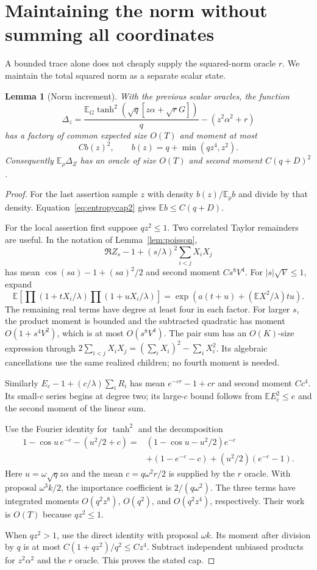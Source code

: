 \documentclass[11pt]{article}
\newtheorem{lemma}[theorem]{Lemma}
\newcommand{\E}{\mathbb E}
\begin{document}
\section{Maintaining the norm without summing all coordinates}
A bounded trace alone does not cheaply supply the squared-norm oracle $r$. We maintain the total squared norm as a separate scalar state.

\begin{lemma}[Norm increment]
\label{lem:norm}
With the previous scalar oracles, the function
\[
 \Delta_z=\frac{\E_G\tanh^2(\sqrt q[z\alpha+\sqrt rG])}{q}
                         -(z^2\alpha^2+r)
\]
has a factory of common expected size $O(T)$ and moment at most
\[
 C b(z)^2,\qquad b(z)=q+\min(qz^4,z^2).
\]
Consequently $\E_\rho\Delta_Z$ has an oracle of size $O(T)$ and second moment $C(q+D)^2$.
\end{lemma}
\begin{proof}
For the last assertion sample $z$ with density $b(z)/\E_\rho b$ and divide by that density. Equation~\eqref{eq:entropycap2} gives $\E b\le C(q+D)$.

For the local assertion first suppose $qz^2\le1$. Two correlated Taylor remainders are useful. In the notation of Lemma~\ref{lem:poisson},
\[
 \Re Z_s-1+(s/\lambda)^2\sum_{i<j}X_iX_j
\]
has mean $\cos(sa)-1+(sa)^2/2$ and second moment $Cs^8V^4$. For $|s|\sqrt V\le1$, expand
\[
 \E\left[\prod(1+tX_i/\lambda)\prod(1+uX_i/\lambda)\right]
       =\exp\left(a(t+u)+(\E X^2/\lambda)tu\right).
\]
The remaining real terms have degree at least four in each factor. For larger $s$, the product moment is bounded and the subtracted quadratic has moment $O(1+s^4V^2)$, which is at most $O(s^8V^4)$. The pair sum has an $O(K)$-size expression through
$2\sum_{i<j}X_iX_j=(\sum_iX_i)^2-\sum_iX_i^2$. Its algebraic cancellations use the same realized children; no fourth moment is needed.

Similarly $E_c-1+(c/\lambda)\sum_iR_i$ has mean $e^{-cr}-1+cr$ and second moment $Cc^4$. Its small-$c$ series begins at degree two; its large-$c$ bound follows from $\E E_c^2\le e$ and the second moment of the linear sum.

Use the Fourier identity for $\tanh^2$ and the decomposition
\begin{align*}
 1-\cos u\,e^{-c}-(u^2/2+c)
 ={}&(1-\cos u-u^2/2)e^{-c}\\
 &+(1-e^{-c}-c)+(u^2/2)(e^{-c}-1).
\end{align*}
Here $u=\omega\sqrt qz\alpha$ and the mean $c=q\omega^2r/2$ is supplied by the $r$ oracle. With proposal $\omega^3k/2$, the importance coefficient is $2/(q\omega^2)$. The three terms have integrated moments $O(q^2z^8)$, $O(q^2)$, and $O(q^2z^4)$, respectively. Their work is $O(T)$ because $qz^2\le1$.

When $qz^2>1$, use the direct identity with proposal $\omega k$. Its moment after division by $q$ is at most $C(1+qz^2)/q^2\le Cz^4$. Subtract independent unbiased products for $z^2\alpha^2$ and the $r$ oracle. This proves the stated cap.
\end{proof}
\end{document}
